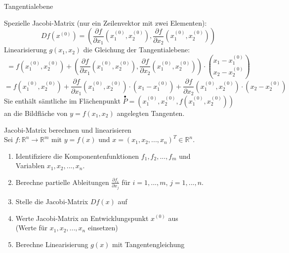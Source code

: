 \begin{corollary}{Tangentialebene}

    Spezielle Jacobi-Matrix (nur ein Zeilenvektor mit zwei Elementen):
    \vspace{-2mm}\\
    $$Df(x^{(0)}) = \left(\frac{\partial f}{\partial x_1}(x_1^{(0)}, x_2^{(0)}), \frac{\partial f}{\partial x_2}(x_1^{(0)}, x_2^{(0)})\right)$$
    Linearisierung $g(x_1, x_2)$ die Gleichung der Tangentialebene: 
    $$=f(x_1^{(0)}, x_2^{(0)}) + (\frac{\partial f}{\partial x_1}(x_1^{(0)}, x_2^{(0)}), \frac{\partial f}{\partial x_2}(x_1^{(0)}, x_2^{(0)})) \cdot \binom{x_1 - x_1^{(0)}}{x_2 - x_2^{(0)}}$$
    $$= f(x_1^{(0)}, x_2^{(0)}) + \frac{\partial f}{\partial x_1}(x_1^{(0)}, x_2^{(0)}) \cdot (x_1 - x_1^{(0)}) + \frac{\partial f}{\partial x_2}(x_1^{(0)}, x_2^{(0)}) \cdot (x_2 - x_2^{(0)})$$
    \small
    Sie enthält sämtliche im Flächenpunkt 
    $\stackrel{\bullet}{P}=(x_1^{(0)}, x_2^{(0)}, f(x_1^{(0)}, x_2^{(0)}))$ \\
    an die Bildfläche von $y=f(x_1, x_2)$ angelegten Tangenten.
\end{corollary}

\begin{KR}{Jacobi-Matrix berechnen und linearisieren}\\
Sei $f: \mathbb{R}^n \rightarrow \mathbb{R}^m$ mit $y = f(x)$ und $x = (x_1, x_2, ..., x_n)^T \in \mathbb{R}^n$. 
\vspace{-2mm}\\
\begin{enumerate}
    \item Identifiziere die Komponentenfunktionen $f_1, f_2, ..., f_m$ und \\ Variablen $x_1, x_2, ..., x_n$.
    \item Berechne partielle Ableitungen $\frac{\partial f_i}{\partial x_j}$ für $i = 1, ..., m$, $j = 1, ..., n$.
    \item Stelle die Jacobi-Matrix $Df(x)$ auf
    \item Werte Jacobi-Matrix an Entwicklungspunkt $x^{(0)}$ aus\\ (Werte für $x_1, x_2, ..., x_n$ einsetzen)
    \item Berechne Linearisierung $g(x)$ mit Tangentengleichung
\end{enumerate}
\end{KR}

